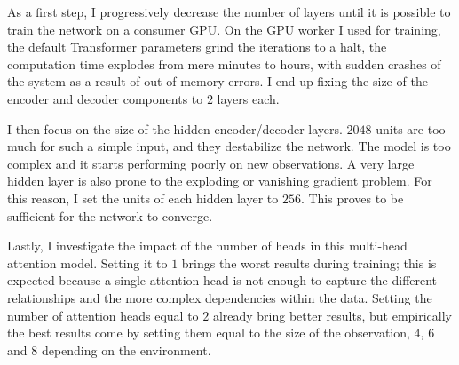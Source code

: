 As a first step, I progressively decrease the number of layers until it is possible to train the network on a consumer GPU. On the GPU worker I used for training, the default Transformer parameters grind the iterations to a halt, the computation time explodes from mere minutes to hours, with sudden crashes of the system as a result of out-of-memory errors. I end up fixing the size of the encoder and decoder components to $2$ layers each.

I then focus on the size of the hidden encoder/decoder layers. $2048$ units are too much for such a simple input, and they destabilize the network. The model is too complex and it starts performing poorly on new observations. A very large hidden layer is also prone to the exploding or vanishing gradient problem. For this reason, I set the units of each hidden layer to $256$. This proves to be sufficient for the network to converge.

Lastly, I investigate the impact of the number of heads in this multi-head attention model. Setting it to $1$ brings the worst results during training; this is expected because a single attention head is not enough to capture the different  relationships and the more complex dependencies within the data. Setting the number of attention heads equal to $2$ already bring better results, but empirically the best results come by setting them equal to the size of the observation, $4$, $6$ and $8$ depending on the environment.

